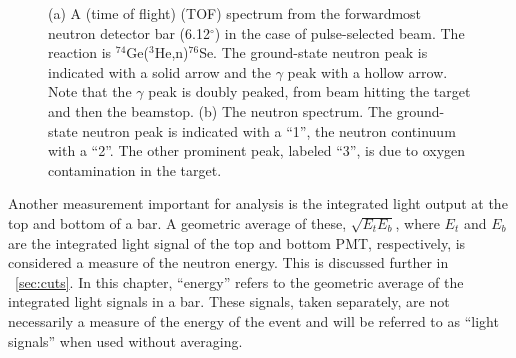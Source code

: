 \begin{figure}[!htbp]
\centering
{}
\caption{(a) A (time of flight) (TOF) spectrum from the forwardmost neutron detector bar (6.12$^{\circ}$) in the case of pulse-selected beam.  The reaction is $^{74}$Ge($^3$He,n)$^{76}$Se.  The ground-state neutron peak is indicated with a solid arrow and the $\gamma$ peak with a hollow arrow.  Note that the $\gamma$ peak is doubly peaked, from beam hitting the target and then the beamstop.  (b) The neutron spectrum.  The ground-state neutron peak is indicated with a ``1'', the neutron continuum with a ``2''.  The other prominent peak, labeled ``3'', is due to oxygen contamination in the target.}
\label{fig:time}
\end{figure}
Another measurement important for analysis is the integrated light output at the top and bottom of a bar.  A geometric average of these, $\sqrt{E_tE_b}$, where $E_t$ and $E_b$ are the integrated light signal of the top and bottom PMT, respectively, is considered a measure of the neutron energy.  This is discussed further in {\sect}~\ref{sec:cuts}.  In this chapter, ``energy'' refers to the geometric average of the integrated light signals in a bar.  These signals, taken separately, are not necessarily a measure of the energy of the event and will be referred to as ``light signals'' when used without averaging. 


